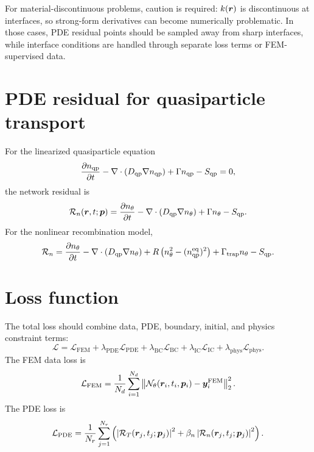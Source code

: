 \documentclass[11pt]{article}
\begin{document}
For material-discontinuous problems, caution is required: $k(\bm{r})$ is discontinuous at interfaces, so strong-form derivatives can become numerically problematic. In those cases, PDE residual points should be sampled away from sharp interfaces, while interface conditions are handled through separate loss terms or FEM-supervised data.

\section{PDE residual for quasiparticle transport}
For the linearized quasiparticle equation
\begin{equation}
\frac{\partial n_{\mathrm{qp}}}{\partial t}-\nabla\cdot(D_{\mathrm{qp}}\nabla n_{\mathrm{qp}})+\Gamma n_{\mathrm{qp}}-S_{\mathrm{qp}}=0,
\end{equation}
the network residual is
\begin{equation}
\mathcal{R}_n(\bm{r},t;\bm{p})
=\frac{\partial n_\theta}{\partial t}
-\nabla\cdot(D_{\mathrm{qp}}\nabla n_\theta)
+\Gamma n_\theta-S_{\mathrm{qp}}.
\end{equation}
For the nonlinear recombination model,
\begin{equation}
\mathcal{R}_n
=\frac{\partial n_\theta}{\partial t}
-\nabla\cdot(D_{\mathrm{qp}}\nabla n_\theta)
+R\left(n_\theta^2-(n_{\mathrm{qp}}^{\mathrm{eq}})^2\right)
+\Gamma_{\mathrm{trap}}n_\theta-S_{\mathrm{qp}}.
\end{equation}

\section{Loss function}
The total loss should combine data, PDE, boundary, initial, and physics constraint terms:
\begin{equation}
\mathcal{L}
=\mathcal{L}_{\mathrm{FEM}}
+\lambda_{\mathrm{PDE}}\mathcal{L}_{\mathrm{PDE}}
+\lambda_{\mathrm{BC}}\mathcal{L}_{\mathrm{BC}}
+\lambda_{\mathrm{IC}}\mathcal{L}_{\mathrm{IC}}
+\lambda_{\mathrm{phys}}\mathcal{L}_{\mathrm{phys}}.
\end{equation}
The FEM data loss is
\begin{equation}
\mathcal{L}_{\mathrm{FEM}}=\frac{1}{N_d}\sum_{i=1}^{N_d}
\left\|\mathcal{N}_\theta(\bm{r}_i,t_i,\bm{p}_i)-\bm{y}^{\mathrm{FEM}}_i\right\|_2^2.
\end{equation}
The PDE loss is
\begin{equation}
\mathcal{L}_{\mathrm{PDE}}=\frac{1}{N_r}\sum_{j=1}^{N_r}
\left(\left|\mathcal{R}_T(\bm{r}_j,t_j;\bm{p}_j)\right|^2+\beta_n\left|\mathcal{R}_n(\bm{r}_j,t_j;\bm{p}_j)\right|^2\right).
\end{equation}
\end{document}
